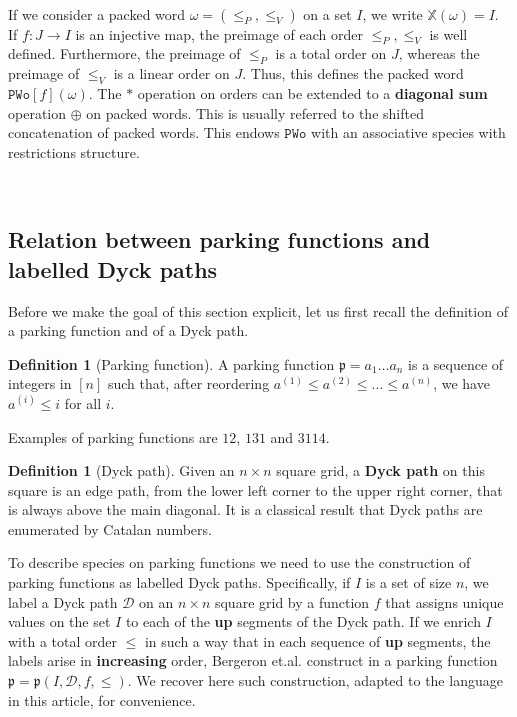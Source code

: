 \documentclass[12pt, reqno]{amsart}
\theoremstyle{definition}
\newtheorem{defin}[thm]{Definition}
\begin{document}
\

\label{defin:pwo}
If we consider a packed word $\omega = (\leq_P, \leq_V) $ on a set $I$, we write $\mathbb{X}(\omega) = I$.
If $f:J \to I $ is an injective map, the preimage of each order $\leq_P, \leq_V$ is well defined.
Furthermore, the preimage of $\leq_P$ is a total order on $J$, whereas the preimage of $\leq_V$ is a linear order on $J$.
Thus, this defines the packed word $\mathtt{PWo}[f](\omega )$.
The $\ast $ operation on orders can be extended to a \textbf{diagonal sum} operation $\oplus $ on packed words.
This is usually referred to the shifted concatenation of packed words.
This endows $\mathtt{PWo}$ with an  associative species with restrictions structure.

\

\subsection{Relation between parking functions and labelled Dyck paths}

Before we make the goal of this section explicit, let us first recall the definition of a parking function and of a Dyck path.

\begin{defin}[Parking function]
A parking function $\mathfrak{p} = a_1 \dots a_n$ is a sequence of integers in $[n]$ such that, after reordering $a^{(1)} \leq a^{(2)} \leq \dots \leq a^{(n)}$, we have $a^{(i)} \leq i$ for all $i$.
\end{defin}

Examples of parking functions are $12$, $131$ and $3114$.

\begin{defin}[Dyck path]
Given an $n\times n$ square grid, a \textbf{Dyck path} on this square is an edge path, from the lower left corner to the upper right corner, that is always above the main diagonal.
It is a classical result that Dyck paths are enumerated by Catalan numbers.
\end{defin}


To describe species on parking functions we need to use the construction of parking functions as labelled Dyck paths.
Specifically, if $I$ is a set of size $n$, we label a Dyck path $\mathcal D$ on an $n\times n$ square grid by a function $f$ that assigns unique values on the set $I$ to each of the \textbf{up} segments of the Dyck path.
If we enrich $I$ with a total order $\leq$ in such a way that in each sequence of \textbf{up} segments, the labels arise in \textbf{increasing} order, Bergeron et.al. construct in \cite{BGLPV2021} a parking function $\mathfrak{p} = \mathfrak{p}(I, \mathcal D, f, \leq) $.
We recover here such construction, adapted to the language in this article, for convenience.
\end{document}
